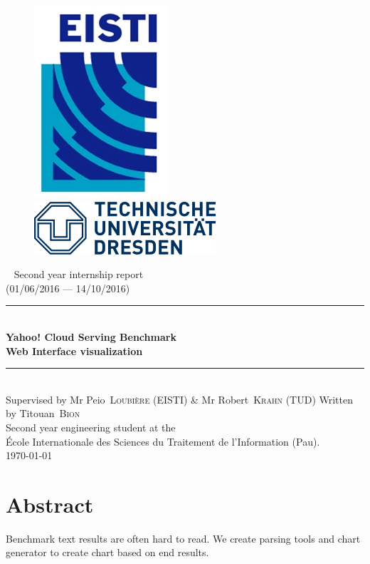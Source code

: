 \documentclass[a4paper,11pt]{report}
\newcommand*{\HRule}{\rule{\linewidth}{0.4mm}}  %
\newcommand*{\auteur}[2]{\large #1~\textsc{#2}} %
\newcommand{\pretitre}{Second year internship report \\ (01/06/2016 --- 14/10/2016)}
\newcommand{\grostitre}{Yahoo! Cloud Serving Benchmark \\ Web Interface visualization}
\newcommand{\auteurs}{Written by \auteur{Titouan}{Bion} \\ Second year engineering student at the \\ École Internationale des Sciences du Traitement de l'Information (Pau).}
\newcommand{\correcteurs}{Supervised by Mr \auteur{Peio}{Loubière} (EISTI) \& Mr \auteur{Robert}{Krahn} (TUD)}
\newcommand{\madate}{\today} %
\begin{document}


\begin{titlepage}
\begin{figure}[h]
\includegraphics[scale=1]{images/Logo_EISTI.png}
\hfill
\includegraphics[scale=0.6]{images/Logo_TUD.png}
\end{figure}
  \begin{center}
    ~
    \vfill
    {\Large\pretitre\\}           %
    \vspace{2cm}
    \HRule \\[0.4cm]
    {\Huge\bf\grostitre\\[0.4cm]} %
    \HRule \\[0.4cm]
    \vspace{2cm}
   	\correcteurs
    \medskip
    \vfill
    \auteurs\\                    %
    \vfill
    {\large\madate}               %
  \end{center}
\end{titlepage}

\chapter*{Abstract}

Benchmark text results are often hard to read. We create parsing tools and chart generator to create chart based on end results.
\end{document}
